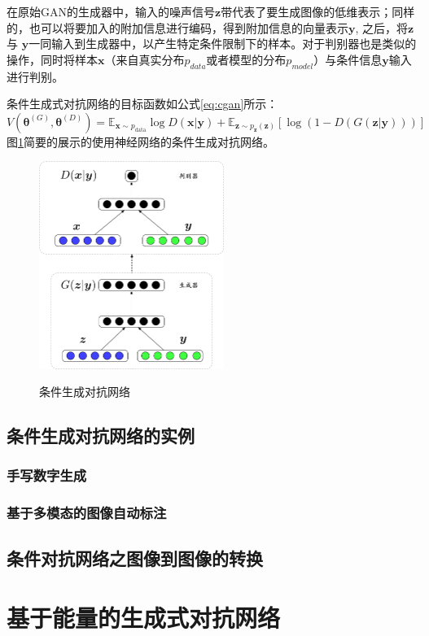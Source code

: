 \documentclass[11pt]{ctexart}
\begin{document}
在原始GAN的生成器中，输入的噪声信号$\bm z$带代表了要生成图像的低维表示；同样的，也可以将要加入的附加信息进行编码，得到附加信息的向量表示$\bm y$, 之后，将$\bm z$与 $\bm y$一同输入到生成器中，以产生特定条件限制下的样本。对于判别器也是类似的操作，同时将样本$\bm x$（来自真实分布$p_{data}$或者模型的分布$p_{model}$）与条件信息$\bm y$输入进行判别。

条件生成式对抗网络的目标函数如公式\ref{eq:cgan}所示：
\begin{equation}
\label{eq:cgan}
	V(\bm \theta^{(G)}, \bm \theta^{(D)}) = \mathbb{E}_{\bm x\sim p_{\mathrm{data}}}\log D\left(\bm x | \bm y\right) + \mathbb{E}_{\bm z\sim p_{\bm z}\left(\bm z\right)}\left[\log\left(1-D\left(G\left(\bm z|\bm y\right)\right)\right)\right]
\end{equation}
图\ref{fig:cgan}简要的展示的使用神经网络的条件生成对抗网络。
\begin{figure}
	\centering
	\includegraphics[width=6cm]{CGAN}
	\label{fig:cgan}
	\caption{条件生成对抗网络}
\end{figure}

\subsection{条件生成对抗网络的实例}
\subsubsection{手写数字生成}


\subsubsection{基于多模态的图像自动标注}
\subsection{条件对抗网络之图像到图像的转换}


\section{基于能量的生成式对抗网络}
\newpage

\nocite{*}

\end{document}
